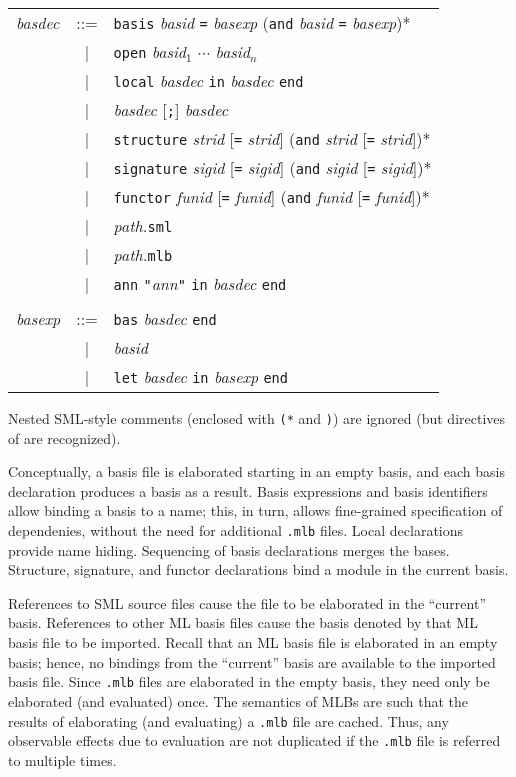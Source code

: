 \begin{htmlonly}
\begin{center}
\begin{tabular}{lcl}
{\it basdec} 
& ::=    & {\tt basis} {\it basid} {\tt =} {\it basexp}
            ({\tt and} {\it basid} {\tt =} {\it basexp})* \\
& | & {\tt open} {\it basid}$_1$ $\cdots$ {\it basid}$_n$ \\
& | & {\tt local} {\it basdec} {\tt in} {\it basdec} {\tt end} \\
& | & {\it basdec} [{\tt;}] {\it basdec} \\
& | & {\tt structure} {\it strid} [{\tt =} {\it strid}] 
                ({\tt and} {\it strid} [{\tt =} {\it strid}])* \\
& | & {\tt signature} {\it sigid} [{\tt =} {\it sigid}] 
                ({\tt and} {\it sigid} [{\tt =} {\it sigid}])* \\
& | &   {\tt functor} {\it funid} [{\tt =} {\it funid}] 
                ({\tt and} {\it funid} [{\tt =} {\it funid}])* \\
& | & {\it path.}{\tt sml} \\
& | & {\it path.}{\tt mlb} \\
& | & {\tt ann} {\tt"}{\it ann}{\tt"} {\tt in} {\it basdec} {\tt end} \\
\\
{\it basexp}
& ::=    & {\tt bas} {\it basdec} {\tt end} \\
& | & {\it basid} \\
& | & {\tt let} {\it basdec} {\tt in} {\it basexp} {\tt end}
\end{tabular}
\end{center}
\end{htmlonly}

Nested SML-style comments (enclosed with {\tt (*} and {\tt *)}) are
ignored (but {\nline} directives of  are recognized).

Conceptually, a basis file is elaborated starting in an empty basis,
and each basis declaration produces a basis as a result.  Basis
expressions and basis identifiers allow binding a basis to a name;
this, in turn, allows fine-grained specification of dependenies,
without the need for additional {\tt .mlb} files.  Local declarations
provide name hiding.  Sequencing of basis declarations merges the
bases.  Structure, signature, and functor declarations bind a module
in the current basis.

References to SML source files cause the file to be elaborated in the
``current'' basis.  References to other ML basis files cause the basis
denoted by that ML basis file to be imported.  Recall that an ML basis
file is elaborated in an empty basis; hence, no bindings from the
``current'' basis are available to the imported basis file.  Since
{\tt .mlb} files are elaborated in the empty basis, they need only be
elaborated (and evaluated) once.  The semantics of MLBs are such that
the results of elaborating (and evaluating) a {\tt .mlb} file are
cached.  Thus, any observable effects due to evaluation are not
duplicated if the {\tt .mlb} file is referred to multiple times.

